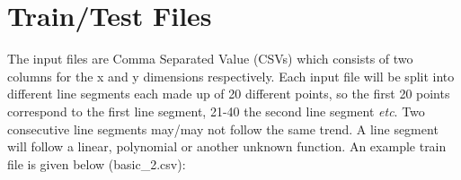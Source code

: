\documentclass[10pt]{article}
\begin{document}
%
%
%
%


\section{Train/Test Files}
\label{sec:train_files}
The input files are Comma Separated Value (CSVs) which consists of two columns for the x and y dimensions respectively.
Each input file will be split into different line segments each made up of 20 different points, so the first 20 points correspond to the first line segment, 21-40 the second line segment \textit{etc}.
Two consecutive line segments may/may not follow the same trend.
A line segment will follow a linear, polynomial or another unknown function.
An example train file is given below (basic\_2.csv): 
\end{document}

